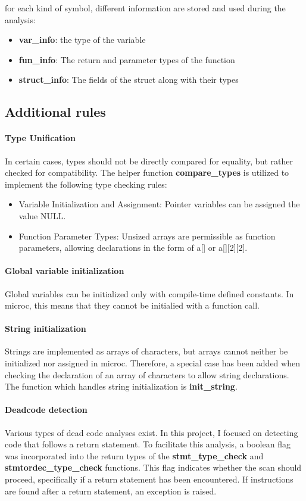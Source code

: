 \documentclass{article}
\begin{document}
for each kind of symbol, different information are stored and used during the analysis:
\begin{itemize}
  \item \textbf{var\_info}: the type of the variable
  \item \textbf{fun\_info}: The return and parameter types of the function
  \item \textbf{struct\_info}: The fields of the struct along with their types
\end{itemize}


\subsection{Additional rules}
\paragraph*{Type Unification}
   In certain cases, types should not be directly compared for equality, but rather checked for compatibility.
   The helper function \textbf{compare\_types} is utilized to implement the following type checking rules:
  \begin{itemize}
    \item Variable Initialization and Assignment: Pointer variables can be assigned the value NULL.
    \item Function Parameter Types: Unsized arrays are permissible as function parameters, allowing declarations in the form of a[] or a[][2][2].
  \end{itemize}

\paragraph*{Global variable initialization}
Global variables can be initialized only with compile-time defined constants. In microc, this means that
they cannot be initialied with a function call.

\paragraph*{String initialization}
Strings are implemented as arrays of characters, but arrays cannot neither be initialized nor assigned in microc.
Therefore, a special case has been added when checking the declaration of an array of characters to allow string declarations.
The function which handles string initialization is \textbf{init\_string}.


\paragraph*{Deadcode detection}
Various types of dead code analyses exist. In this project, I focused on detecting code that follows a return statement.
To facilitate this analysis, a boolean flag was incorporated into the return types of the \textbf{stmt\_type\_check}
and \textbf{stmtordec\_type\_check} functions. This flag indicates whether the scan should proceed, specifically if
a return statement has been encountered. If instructions are found after a return statement, an exception is raised.
\end{document}
